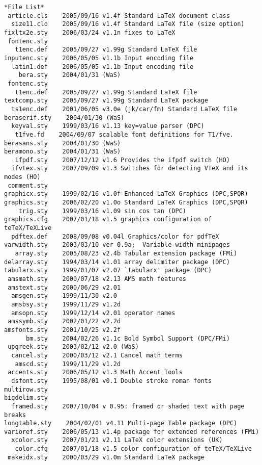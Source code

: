 \begin{table}[htb]
\begin{lstlisting}[breaklines,xrightmargin=-\marginparwidth]
 *File List*
 article.cls    2005/09/16 v1.4f Standard LaTeX document class
  size11.clo    2005/09/16 v1.4f Standard LaTeX file (size option)
fixltx2e.sty    2006/03/24 v1.1n fixes to LaTeX
 fontenc.sty
   t1enc.def    2005/09/27 v1.99g Standard LaTeX file
inputenc.sty    2006/05/05 v1.1b Input encoding file
  latin1.def    2006/05/05 v1.1b Input encoding file
    bera.sty    2004/01/31 (WaS)
 fontenc.sty
   t1enc.def    2005/09/27 v1.99g Standard LaTeX file
textcomp.sty    2005/09/27 v1.99g Standard LaTeX package
  ts1enc.def    2001/06/05 v3.0e (jk/car/fm) Standard LaTeX file
beraserif.sty    2004/01/30 (WaS)
  keyval.sty    1999/03/16 v1.13 key=value parser (DPC)
   t1fve.fd    2004/09/07 scalable font definitions for T1/fve.
berasans.sty    2004/01/30 (WaS)
beramono.sty    2004/01/31 (WaS)
   ifpdf.sty    2007/12/12 v1.6 Provides the ifpdf switch (HO)
  ifvtex.sty    2007/09/09 v1.3 Switches for detecting VTeX and its modes (HO)
 comment.sty    
graphicx.sty    1999/02/16 v1.0f Enhanced LaTeX Graphics (DPC,SPQR)
graphics.sty    2006/02/20 v1.0o Standard LaTeX Graphics (DPC,SPQR)
    trig.sty    1999/03/16 v1.09 sin cos tan (DPC)
graphics.cfg    2007/01/18 v1.5 graphics configuration of teTeX/TeXLive
  pdftex.def    2008/09/08 v0.04l Graphics/color for pdfTeX
varwidth.sty    2003/03/10 ver 0.9a;  Variable-width minipages
   array.sty    2005/08/23 v2.4b Tabular extension package (FMi)
delarray.sty    1994/03/14 v1.01 array delimiter package (DPC)
tabularx.sty    1999/01/07 v2.07 `tabularx' package (DPC)
 amsmath.sty    2000/07/18 v2.13 AMS math features
 amstext.sty    2000/06/29 v2.01
  amsgen.sty    1999/11/30 v2.0
  amsbsy.sty    1999/11/29 v1.2d
  amsopn.sty    1999/12/14 v2.01 operator names
 amssymb.sty    2002/01/22 v2.2d
amsfonts.sty    2001/10/25 v2.2f
      bm.sty    2004/02/26 v1.1c Bold Symbol Support (DPC/FMi)
 upgreek.sty    2003/02/12 v2.0 (WaS)
  cancel.sty    2000/03/12 v2.1 Cancel math terms
   amscd.sty    1999/11/29 v1.2d
 accents.sty    2006/05/12 v1.3 Math Accent Tools
  dsfont.sty    1995/08/01 v0.1 Double stroke roman fonts
multirow.sty    
bigdelim.sty    
  framed.sty    2007/10/04 v 0.95: framed or shaded text with page breaks
longtable.sty    2004/02/01 v4.11 Multi-page Table package (DPC)
varioref.sty    2006/05/13 v1.4p package for extended references (FMi)
  xcolor.sty    2007/01/21 v2.11 LaTeX color extensions (UK)
   color.cfg    2007/01/18 v1.5 color configuration of teTeX/TeXLive
 makeidx.sty    2000/03/29 v1.0m Standard LaTeX package

\end{lstlisting}
\end{table}
